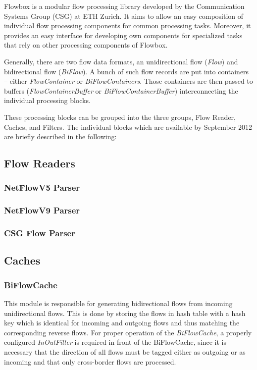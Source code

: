 Flowbox is a modular flow processing library developed by the Communication Systems Group (CSG) at ETH Zurich. It aims to allow an easy composition of individual flow processing components for common processing tasks. Moreover, it provides an easy interface for developing own components for specialized tasks that rely on other processing components of Flowbox.

Generally, there are two flow data formats, an unidirectional flow (\emph{Flow}) and bidirectional flow (\emph{BiFlow}). A bunch of such flow records are put into containers -- either \emph{FlowContainer} or \emph{BiFlowContainers}. Those containers are then passed to buffers (\emph{FlowContainerBuffer} or \emph{BiFlowContainerBuffer}) interconnecting the individual processing blocks.

These processing blocks can be grouped into the three groups, Flow Reader, Caches, and Filters. The individual blocks which are available by September 2012 are briefly described in the following:

\subsection{Flow Readers}

\subsubsection{NetFlowV5 Parser} 
\subsubsection{NetFlowV9 Parser}
\subsubsection{CSG Flow Parser} 


\subsection{Caches}
\subsubsection{BiFlowCache} This module is responsible for generating
bidirectional flows from incoming unidirectional flows. This is done by
storing the flows in hash table with a hash key which is identical for incoming
and outgoing flows and thus matching the corresponding reverse flows. For proper operation of the \emph{BiFlowCache}, a properly configured \emph{InOutFilter} is required in front of the BiFlowCache, since it is necessary that the direction of all flows must be tagged either as outgoing or as incoming and that only cross-border flows are processed.

